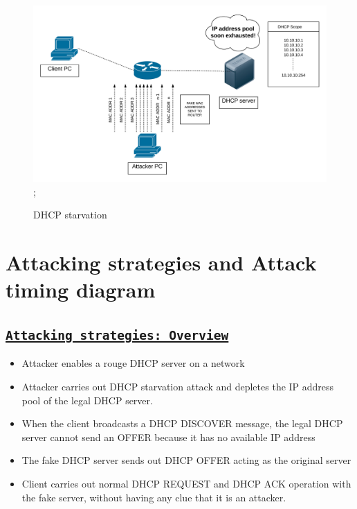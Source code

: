 \documentclass[12pt]{article}
\begin{document}
\begin{sloppypar}
\begin{sloppypar}
	
	\begin{figure}[]
		\centering
		\includegraphics[width=12 cm,height=7 cm]{images/DHCP_STARVATION.png};
		\caption{DHCP starvation}
	\end{figure}

\end{sloppypar}

\section{Attacking strategies and Attack timing diagram}
\subsection{\texttt{\underline{Attacking strategies: Overview} }}

\begin{itemize}
	\item Attacker enables a rouge DHCP server on a network
	
	\item Attacker carries out DHCP starvation attack and depletes the IP address pool of the legal DHCP server.
	
	\item When the client broadcasts a DHCP DISCOVER message, the legal DHCP server cannot send an OFFER because it has no available IP address
	
	\item The fake DHCP server sends out DHCP OFFER acting as the original server
	
	\item Client carries out normal DHCP REQUEST and DHCP ACK operation with the fake server, without having any clue that it is an attacker.
	
\end{itemize}


\end{sloppypar}
\end{document}
